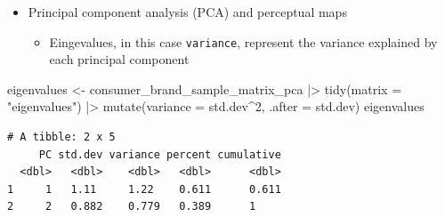 \documentclass[
  ignorenonframetext,
]{beamer}
\newenvironment{Shaded}{\begin{snugshade}}{\end{snugshade}}
\newcommand{\AttributeTok}[1]{\textcolor[rgb]{0.40,0.45,0.13}{#1}}
\newcommand{\DecValTok}[1]{\textcolor[rgb]{0.68,0.00,0.00}{#1}}
\newcommand{\FunctionTok}[1]{\textcolor[rgb]{0.28,0.35,0.67}{#1}}
\newcommand{\NormalTok}[1]{\textcolor[rgb]{0.00,0.23,0.31}{#1}}
\newcommand{\OtherTok}[1]{\textcolor[rgb]{0.00,0.23,0.31}{#1}}
\newcommand{\SpecialCharTok}[1]{\textcolor[rgb]{0.37,0.37,0.37}{#1}}
\newcommand{\StringTok}[1]{\textcolor[rgb]{0.13,0.47,0.30}{#1}}
\providecommand{\tightlist}{%
  \setlength{\itemsep}{0pt}\setlength{\parskip}{0pt}}\usepackage{longtable,booktabs,array}
\begin{document}
\begin{frame}[fragile]{}
\label{section-39}
\begin{itemize}
\item
  Principal component analysis (PCA) and perceptual maps

  \begin{itemize}
  \tightlist
  \item
    Eingevalues, in this case \texttt{variance}, represent the variance
    explained by each principal component
  \end{itemize}
\end{itemize}

\tiny

\begin{Shaded}
\begin{Highlighting}[]
\NormalTok{eigenvalues }\OtherTok{\textless{}{-}}\NormalTok{ consumer\_brand\_sample\_matrix\_pca }\SpecialCharTok{|\textgreater{}} 
  \FunctionTok{tidy}\NormalTok{(}\AttributeTok{matrix =} \StringTok{"eigenvalues"}\NormalTok{) }\SpecialCharTok{|\textgreater{}} 
  \FunctionTok{mutate}\NormalTok{(}\AttributeTok{variance =}\NormalTok{ std.dev}\SpecialCharTok{\^{}}\DecValTok{2}\NormalTok{, }\AttributeTok{.after =}\NormalTok{ std.dev)}
\NormalTok{eigenvalues}
\end{Highlighting}
\end{Shaded}

\begin{verbatim}
# A tibble: 2 x 5
     PC std.dev variance percent cumulative
  <dbl>   <dbl>    <dbl>   <dbl>      <dbl>
1     1   1.11     1.22    0.611      0.611
2     2   0.882    0.779   0.389      1    
\end{verbatim}
\end{frame}
\end{document}
